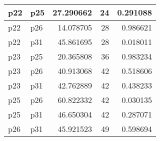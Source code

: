 \begin{table}
\begin{tabular}[t]{l|l|r|r|r}
\hline
p22 & p25 & 27.290662 & 24 & 0.291088\\
\hline
p22 & p26 & 14.078705 & 28 & 0.986621\\
\hline
p22 & p31 & 45.861695 & 28 & 0.018011\\
\hline
p23 & p25 & 20.365808 & 36 & 0.983234\\
\hline
p23 & p26 & 40.913068 & 42 & 0.518606\\
\hline
p23 & p31 & 42.762889 & 42 & 0.438233\\
\hline
p25 & p26 & 60.822332 & 42 & 0.030135\\
\hline
p25 & p31 & 46.650304 & 42 & 0.287071\\
\hline
p26 & p31 & 45.921523 & 49 & 0.598694\\
\hline
\end{tabular}
\end{table}
